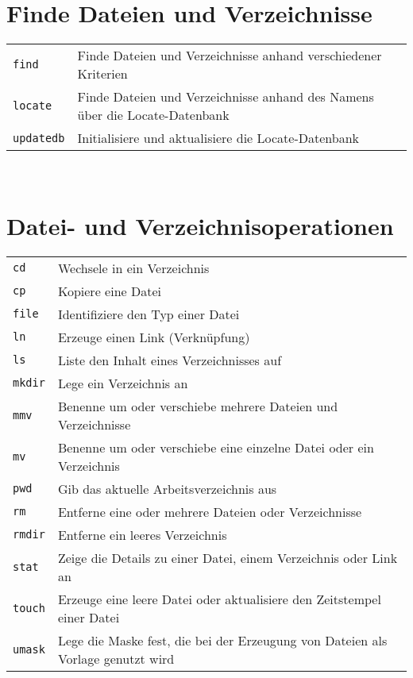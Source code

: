 \documentclass[10pt,a4paper]{article}
\begin{document}
\begin{multicols}{2}
\vfill

\section{Finde Dateien und Verzeichnisse}
\begin{tabular}{ p{2.5cm} p{8.5cm} }
  \hline
  \texttt{find} & Finde Dateien und Verzeichnisse anhand \newline verschiedener Kriterien \\
  \texttt{locate} & Finde Dateien und Verzeichnisse anhand des Namens über die Locate-Datenbank \\
  \texttt{updatedb} & Initialisiere und aktualisiere die Locate-Datenbank \\
  \hline
\end{tabular}

~ \\

\columnbreak

\section{Datei- und Verzeichnisoperationen}
\begin{tabular}{ p{2.5cm} p{8.5cm} }
  \hline
  \texttt{cd} & Wechsele in ein Verzeichnis \\
  \texttt{cp} & Kopiere eine Datei \\
  \texttt{file} & Identifiziere den Typ einer Datei\\
  \texttt{ln} & Erzeuge einen Link (Verknüpfung) \\
  \texttt{ls} & Liste den Inhalt eines Verzeichnisses auf \\
  \texttt{mkdir} & Lege ein Verzeichnis an\\
  \texttt{mmv} & Benenne um oder verschiebe mehrere Dateien und Verzeichnisse \\
  \texttt{mv} & Benenne um oder verschiebe eine einzelne Datei oder ein Verzeichnis \\
  \texttt{pwd} & Gib das aktuelle Arbeitsverzeichnis aus \\
  \texttt{rm} & Entferne eine oder mehrere Dateien oder Verzeichnisse \\
  \texttt{rmdir} & Entferne ein leeres Verzeichnis \\
  \texttt{stat} & Zeige die Details zu einer Datei, einem Verzeichnis oder Link an \\
  \texttt{touch} & Erzeuge eine leere Datei oder aktualisiere den Zeitstempel einer Datei \\
  \texttt{umask} & Lege die Maske fest, die bei der Erzeugung von Dateien als Vorlage genutzt wird \\
  \hline
\end{tabular}


\end{multicols}
\end{document}
